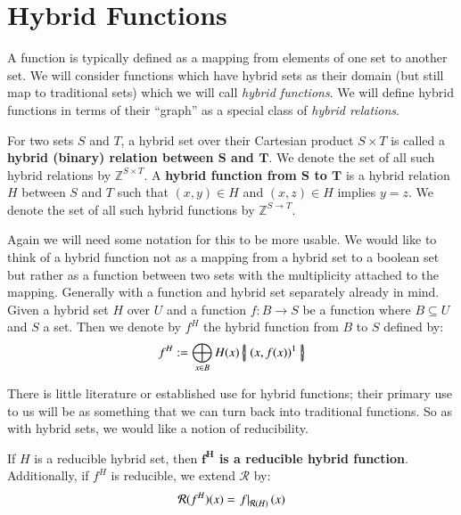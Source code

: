 \section{Hybrid Functions}\label{sec:HybridFunction}


A function is typically defined as a mapping from elements of one set to another set.
We will consider functions which have hybrid sets as their domain (but still map to traditional sets) 
which we will call \emph{hybrid functions}.
We will define hybrid functions in terms of their ``graph'' as a special class of \emph{hybrid relations}.


\begin{definition}
	For two sets $S$ and $T$, a hybrid set over their Cartesian product $S \times T$ is called a 
	\textbf{hybrid (binary) relation between $\boldsymbol{S}$ and $\boldsymbol{T}$}.
	We denote the set of all such hybrid relations by $\mathbb{Z}^{S \times T}$. 
	A \textbf{hybrid function from $\boldsymbol{S}$ to $\boldsymbol{T}$} is 
	a hybrid relation $H$ between $S$ and $T$ such that $(x,y) \in H$ and $(x,z) \in H$ implies $y=z$.
	We denote the set of all such hybrid functions by $\mathbb{Z}^{S \to T}$.
\end{definition}


Again we will need some notation for this to be more usable.
We would like to think of a hybrid function not as a mapping from a hybrid set to a boolean set but rather as
a function between two sets with the multiplicity attached to the mapping.
Generally with a function and hybrid set separately already in mind.
Given a hybrid set $H$ over $U$ and a function $f:B \to S$ be a function where $B \subseteq U$ and $S$ a set.
Then we denote by $f^H$ the hybrid function from $B$ to $S$ defined by:
\begin{equation}
	\label{hfunc}
	f^H := \bigoplus_{x \in B} H(x) \left\{ \! \left| \;  (x, f(x) )^1  \; \right| \! \right\}
\end{equation}


There is little literature or established use for hybrid functions;
their primary use to us will be as something that we can turn back into traditional functions.
So as with hybrid sets, we would like a notion of reducibility.


\begin{definition}
	If $H$ is a reducible hybrid set, then \textbf{$\boldsymbol{f^H}$ is a reducible hybrid function}. 
	Additionally, if $f^H$ is reducible, we extend $\mathcal{R}$ by:
	\begin{equation}
		\mathcal{R}(f^H)(x) = \left.f\right|_{\mathcal{R}(H)}(x)
	\end{equation}
\end{definition}


